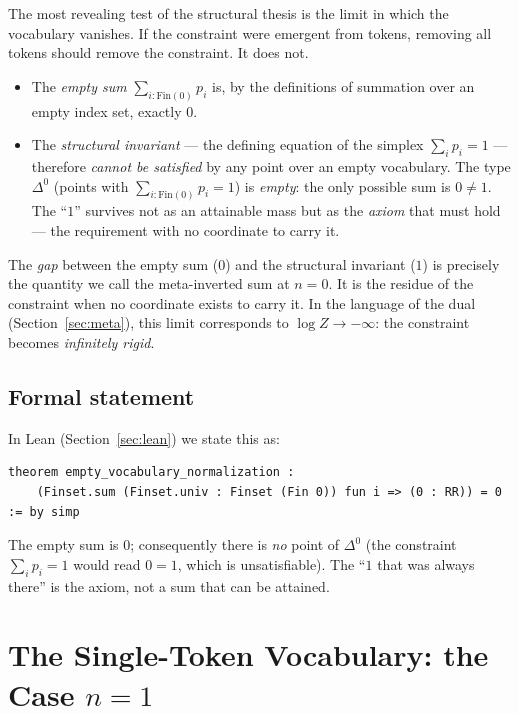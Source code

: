\documentclass[11pt]{article}
\newcommand{\simplex}[1]{\Delta^{#1}}
\begin{document}
The most revealing test of the structural thesis is the limit in which the
vocabulary vanishes. If the constraint were emergent from tokens, removing all
tokens should remove the constraint. It does not.

\begin{itemize}
\item The \emph{empty sum} $\sum_{i:\mathrm{Fin}(0)} p_i$ is, by the
definitions of summation over an empty index set, exactly $0$.
\item The \emph{structural invariant} --- the defining equation of the simplex
$\sum_i p_i = 1$ --- therefore \emph{cannot be satisfied} by any point over an
empty vocabulary.  The type $\simplex{0}$ (points with $\sum_{i:\mathrm{Fin}(0)}
p_i = 1$) is \emph{empty}: the only possible sum is $0 \neq 1$.  The ``$1$''
survives not as an attainable mass but as the \emph{axiom} that must hold --- the
requirement with no coordinate to carry it.
\end{itemize}

The \emph{gap} between the empty sum ($0$) and the structural invariant ($1$)
is precisely the quantity we call the meta-inverted sum at $n=0$. It is the
residue of the constraint when no coordinate exists to carry it. In the
language of the dual (Section~\ref{sec:meta}), this limit corresponds to
$\log Z \to -\infty$: the constraint becomes \emph{infinitely rigid}.

\subsection{Formal statement}
\label{sec:empty-formal}

In Lean (Section~\ref{sec:lean}) we state this as:
\begin{lstlisting}[language=lean]
theorem empty_vocabulary_normalization :
    (Finset.sum (Finset.univ : Finset (Fin 0)) fun i => (0 : RR)) = 0 := by simp
\end{lstlisting}
The empty sum is $0$; consequently there is \emph{no} point of $\simplex{0}$
(the constraint $\sum_i p_i = 1$ would read $0 = 1$, which is unsatisfiable).
The ``$1$ that was always there'' is the axiom, not a sum that can be attained.

\section{The Single-Token Vocabulary: the Case $n=1$}
\label{sec:n1}
\end{document}
